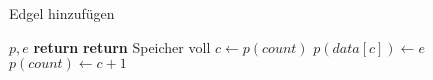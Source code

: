 \begin{algorithm}[ht]
\caption{Edgel hinzufügen}
\label{alg:edgelpool-addedgel}
\begin{algorithmic}[1]
	\Require $p,e$
		\State \textbf{return}
	\EndIf
		\State \textbf{return} \Comment Speicher voll
	\EndIf
	\State $c \gets p(\mathit{count})$
	\State $p(\mathit{data}[c]) \gets e$
	\State $p(\mathit{count}) \gets c + 1$
\end{algorithmic}
\end{algorithm}